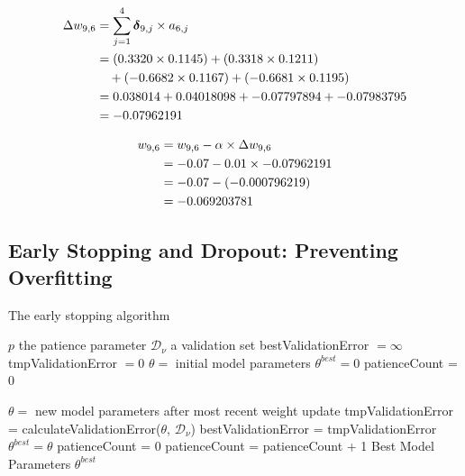\documentclass[xcolor={table}]{beamer}
\begin{document}
 \begin{frame} 
\begin{alignat}{2}
\Delta w_{9,6} &= \sum_{j=1}^4 \boldsymbol{\delta}_{9,j} \times  a_{6,j} \notag\\
~ &= \left(0.3320 \times  0.1145\right) + \left(0.3318 \times  0.1211\right) \notag\\
~&\quad+ \left(-0.6682 \times  0.1167\right) + \left(-0.6681 \times  0.1195\right)  \notag\\
~ & = 0.038014 + 0.04018098 + -0.07797894 + -0.07983795 \notag\\
~ & = -0.07962191
\label{eq:w96BathDelta}
\end{alignat}
\end{frame} 



 \begin{frame} 
\begin{alignat}{2}
w_{9,6} &= w_{9,6} - \alpha \times \Delta w_{9,6} \notag\\
~ &= -0.07 - 0.01\times -0.07962191 \notag\\
~ & = -0.07 - \left(-0.000796219 \right) \notag\\
~ & = -0.069203781
\label{eqn:w96weightupdate}
\end{alignat}
\end{frame} 

\subsection{Early Stopping and Dropout: Preventing Overfitting}

\begin{frame}[plain]
\begin{algorithm}[H]
\tiny
\caption[The early stopping algorithm]{The early stopping algorithm}
\begin{algorithmic}[1]
\Require $p$ the patience parameter 
\Require $\mathcal{D}_\nu$ a validation set
\State bestValidationError $=\infty$
\State tmpValidationError $=0$
\State $\theta=$ initial model parameters
\State $\theta^{best}=0$
\State patienceCount = 0

	\State $\theta=$ new model parameters after most recent weight update
	\State tmpValidationError = calculateValidationError($\theta$, $\mathcal{D}_\nu$)
		\State bestValidationError = tmpValidationError
		\State  $\theta^{best}=\theta$
		\State patienceCount = 0
	\Else
		\State patienceCount = patienceCount + 1
	\EndIf
\EndWhile
\State \Return Best Model Parameters $\theta^{best}$
\end{algorithmic}
\label{alg:earlystopping}
\end{algorithm}
\end{frame}
\end{document}

